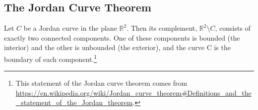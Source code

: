 \documentclass{article}
\begin{document}





\subsection{The Jordan Curve Theorem}
\begin{theorem}
	Let $C$ be a Jordan curve in the plane $\mathbb R^2$. Then its complement, $\mathbb R^2 \setminus C$, consists of exactly two connected components. One of these components is bounded (the interior) and the other is unbounded (the exterior), and the curve C is the boundary of each component.\footnote{This statement of the Jordan curve theorem comes from \url{https://en.wikipedia.org/wiki/Jordan_curve_theorem\#Definitions_and_the_statement_of_the_Jordan_theorem}.}
\end{theorem}
\end{document}
